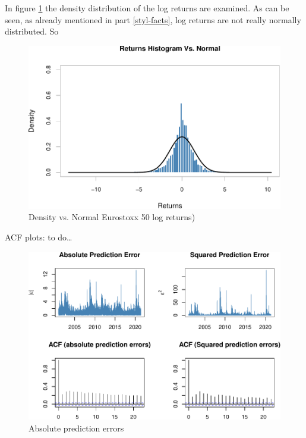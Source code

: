 \documentclass[a4paper, twoside]{templates/ociamthesis}
\begin{document}
\newpage

In figure \ref{fig:plot4} the density distribution of the log returns are examined. As can be seen, as already mentioned in part \ref{styl-facts}, log returns are not really normally distributed. So

\begin{figure}

{\centering \includegraphics[width=0.75\linewidth]{_main_files/figure-latex/plot4-1} 

}

\caption{Density vs. Normal Eurostoxx 50 log returns)}\label{fig:plot4}
\end{figure}

\newpage

ACF plots: to do\ldots{}

\begin{figure}[h]

{\centering \includegraphics[width=1\linewidth]{_main_files/figure-latex/acfplots-1} 

}

\caption{Absolute prediction errors}\label{fig:acfplots}
\end{figure}
\end{document}

